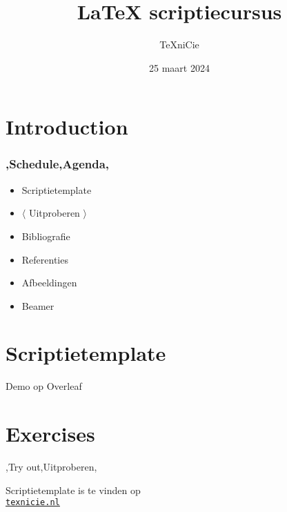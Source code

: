 \documentclass[
    dutch,
    everyoneauthor=true,
    defaultSlideCollection=vincent,
]{../../cursuspresentatie}
\title[\LaTeX{} scriptiecursus]{\LaTeX{} scriptiecursus}
\author[\TeX niCie]{\TeX niCie}%
\date{25 maart 2024}
\begin{document}
\def\placetarget{\hypertarget{introduction}{}}
\section{Introduction}



\begin{frame}
    \frametitle{\lang,Schedule,Agenda,}
    
    \begin{itemize}[label=\textbullet]
        \item Scriptietemplate
        \item $ \langle $ Uitproberen $ \rangle $
        \item Bibliografie
        \item Referenties
        \item Afbeeldingen
	\item Beamer
    \end{itemize}
\end{frame}

\section{Scriptietemplate}
\begin{frame}
    Demo op Overleaf
\end{frame}


\section{Exercises}
\def\placetarget{\hypertarget{exercises1}{}}

\begin{frame}
    \begin{center}
        {\LARGE \lang,Try out,Uitproberen,}
        \vspace{30pt}

        


        {\Large Scriptietemplate is te vinden op\\
         \href{https://texnicie.nl}{\ul{\texttt{texnicie.nl}}}}
    \end{center}
\end{frame}
\end{document}
